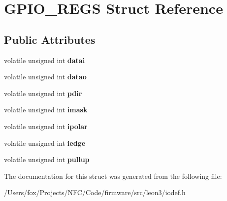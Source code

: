 \hypertarget{struct_g_p_i_o___r_e_g_s}{
\section{GPIO\_\-REGS Struct Reference}
\label{struct_g_p_i_o___r_e_g_s}
}
\subsection*{Public Attributes}
\begin{DoxyCompactItemize}
\item 
\hypertarget{struct_g_p_i_o___r_e_g_s_a3525f3f703aeee5cbb5ce89d5609a46b}{
volatile unsigned int {\bfseries datai}}
\label{struct_g_p_i_o___r_e_g_s_a3525f3f703aeee5cbb5ce89d5609a46b}

\item 
\hypertarget{struct_g_p_i_o___r_e_g_s_a1843bf86d4c3d06dc5190c35c3612f8c}{
volatile unsigned int {\bfseries datao}}
\label{struct_g_p_i_o___r_e_g_s_a1843bf86d4c3d06dc5190c35c3612f8c}

\item 
\hypertarget{struct_g_p_i_o___r_e_g_s_abc391d0f7c71009986cde58d7e1bc39b}{
volatile unsigned int {\bfseries pdir}}
\label{struct_g_p_i_o___r_e_g_s_abc391d0f7c71009986cde58d7e1bc39b}

\item 
\hypertarget{struct_g_p_i_o___r_e_g_s_af8b3820f148d2ff1cbb64b227e114081}{
volatile unsigned int {\bfseries imask}}
\label{struct_g_p_i_o___r_e_g_s_af8b3820f148d2ff1cbb64b227e114081}

\item 
\hypertarget{struct_g_p_i_o___r_e_g_s_abb4d01698fdb6f3b48e5167258ae553a}{
volatile unsigned int {\bfseries ipolar}}
\label{struct_g_p_i_o___r_e_g_s_abb4d01698fdb6f3b48e5167258ae553a}

\item 
\hypertarget{struct_g_p_i_o___r_e_g_s_a04a408530dd4f4afbf112c5988f21603}{
volatile unsigned int {\bfseries iedge}}
\label{struct_g_p_i_o___r_e_g_s_a04a408530dd4f4afbf112c5988f21603}

\item 
\hypertarget{struct_g_p_i_o___r_e_g_s_ad261b9e6f627d049b3a35fd01fa0eca3}{
volatile unsigned int {\bfseries pullup}}
\label{struct_g_p_i_o___r_e_g_s_ad261b9e6f627d049b3a35fd01fa0eca3}

\end{DoxyCompactItemize}


The documentation for this struct was generated from the following file:\begin{DoxyCompactItemize}
\item 
/Users/fox/Projects/NFC/Code/firmware/src/leon3/iodef.h\end{DoxyCompactItemize}
